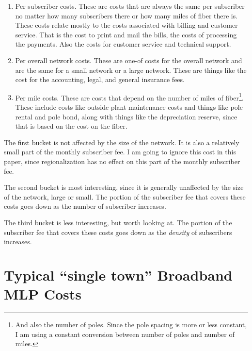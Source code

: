 \documentclass[12pt]{article}
\begin{document}
\begin{enumerate}
\item Per subscriber costs.  These are costs that are always the same per 
subscriber no matter how many subscribers there or how many miles of fiber 
there is.  These costs relate mostly to the costs associated with billing and 
customer service.  That is the cost to print and mail the bills, the costs of 
processing the payments.  Also the costs for customer service and technical 
support.
\item Per overall network costs.  These are one-of costs for the overall 
network and are the same for a small network or a large network.  These are 
things like the cost for the accounting, legal, and general insurance fees.
\item Per mile costs.  These are costs that depend on the number of miles of 
fiber\footnote{And also the number of poles.  Since the pole spacing is more 
or less constant, I am using a constant conversion between number of poles and 
number of miles.}.  These include costs like outside plant maintenance costs and 
things like pole rental and pole bond, along with things like the depreciation 
reserve, since that is based on the cost on the fiber.
\end{enumerate}

The first bucket is not affected by the size of the network.  It is also a 
relatively small part of the monthly subscriber fee.  I am going to ignore 
this cost in this paper, since regionalization has no effect on this part of 
the monthly subscriber fee.

The second bucket is most interesting, since it is generally unaffected by the 
size of the network, large or small.  The portion of the subscriber fee that 
covers these costs goes down as the number of subscriber increases.

The third bucket is less interesting, but worth looking at.  The portion of 
the subscriber fee that covers these costs goes down as the \textit{density} 
of subscribers increases.

\section{Typical ``single town'' Broadband MLP Costs}
\end{document}
